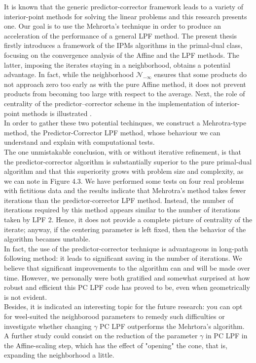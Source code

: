 \documentclass[a4paper,10 pt,titlepage,twoside]{book}
\theoremstyle{plain}
\theoremstyle{definition}
\theoremstyle{remark}
\begin{document}
{{It is known that the generic predictor-corrector framework leads to a variety of interior-point methods for solving the linear problems and this research presents one. Our goal is to use the Mehrorta's technique in order to produce an acceleration of the performance of a general LPF method. The present thesis firstly introduces a framework of the IPMs algorithms in
the primal-dual class, focusing on the convergence analysis of the Affine and the LPF methods. The latter, imposing the iterates staying in a neighborhood,  obtains a potential advantage. In fact, while the neighborhood $\mathcal{N}_{-\infty}$ ensures that some products do not approach zero too early as with the pure Affine method, it does not prevent products from becoming too large with respect to the average. Next, the role of centrality of the predictor–corrector scheme in the implementation of interior-point methods is illustrated . \\
In order to gather these two potential techinques, we construct a Mehrotra-type method, the Predictor-Corrector LPF method, whose
behaviour we can understand and explain with computational tests.\\
The one unmistakable conclusion, with or without iterative refinement, is that the predictor-corrector algorithm is substantially superior to the pure primal-dual algorithm and
that this superiority grows with problem size and complexity, as we can note in Figure 4.3. We have performed some tests on four real
problems with fictitious data and the results indicate that Mehrotra's method takes
fewer iterations than the predictor-corrector LPF
method. Instead, the number of iterations required by this method appears similar to the
number of iterations taken by LPF 2.
Hence, it does not provide a complete picture of centrality of the iterate; anyway, if the centering parameter is left fixed, then the behavior of the
algorithm becames unstable.\\
In fact, the use of the predictor-corrector technique is advantageous in long-path following method: it leads to significant saving in the number of iterations. We believe that significant improvements to the algorithm can and will be made over time.
However, we personally were both gratified and somewhat surprised at how robust and
efficient this PC LPF code has proved to be, even when geometrically is not evident. \\
Besides, it is indicated an interesting
topic for the future research: you can opt for weel-suited the neighborood parameters to remedy such difficulties or investigate whether changing $\gamma$ PC LPF outperforms the Mehrtora's algorithm.\\
A further study could consist on the reduction of the parameter $\gamma$ in PC LPF in the Affine-scaling step, which has the effect of "opening" the cone, that is, expanding the neighborhood a little. 
\appendix
}}
\end{document}
